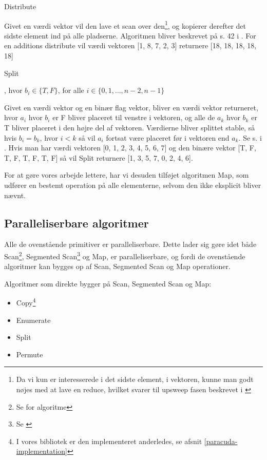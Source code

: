 \modelDesc
{Distribute}
{
\item[Værdi vektor:][$a_0$, $a_1$, \ldots , $a_{n-2}$, $a_{n-1}$]
}
{
Givet en værdi vektor vil den lave et scan over den\footnote{Da vi kun er interesserede i det sidste element, i vektoren, kunne man godt nøjes med at lave en reduce, hvilket svarer til upsweep fasen beskrevet i \cite{harris}}, og kopierer derefter det sidste element ind på alle pladserne. Algoritmen bliver beskrevet på s. 42 i \cite{ble}.
}
{
For en additions distribute vil værdi vektoren [1, 8, 7, 2, 3] returnere [18, 18, 18, 18, 18]
}

\modelDesc
{Split}
{
\item[Værdi vektor:][$a_0$, $a_1$, \ldots , $a_{n-2}$, $a_{n-1}$]
\item[Binær vektor][$b_0$, $b_1$, \ldots , $b_{n-2}$, $b_{n-1}$], hvor $b_i \in \{ T, F\}$, for alle $i \in \{0, 1, \ldots, n-2, n-1\}$
}
{
Givet en værdi vektor og en binær flag vektor, bliver en værdi vektor returneret, hvor $a_i$ hvor $b_i$ er F bliver placeret til venstre i vektoren, og alle de $a_k$ hvor $b_k$ er T bliver placeret i den højre del af vektoren. Værdierne bliver splittet stable, så hvis $b_i = b_k$, hvor $i < k$ så vil $a_i$ fortsat være placeret før i vektoren end $a_k$. Se s.  i \cite{ble}.
}
{
Hvis man har værdi vektoren [0, 1, 2, 3, 4, 5, 6, 7] og den binære vektor [T, F, T, F, T, F, T, F] så vil Split returnere [1, 3, 5, 7, 0, 2, 4, 6].
}

For at gøre vores arbejde lettere, har vi desuden tilføjet algoritmen Map, som udfører en bestemt operation på alle elementerne, selvom den ikke eksplicit bliver nævnt.

\subsection{Paralleliserbare algoritmer}
Alle de ovenstående primitiver er paralleliserbare. Dette lader sig gøre idet både Scan\footnote{Se \cite{harris} for algoritme}, Segmented Scan\footnote{Se \cite{gpu-scan}} og Map, er paralleliserbare, og fordi de ovenstående algoritmer kan bygges op af Scan, Segmented Scan og Map operationer.

Algoritmer som direkte bygger på Scan, Segmented Scan og Map:
\begin{itemize}
 \item Copy\footnote{I vores bibliotek er den implementeret anderledes, se afsnit \ref{paracuda-implementation}}
 \item Enumerate
 \item Split
 \item Permute
\end{itemize}

